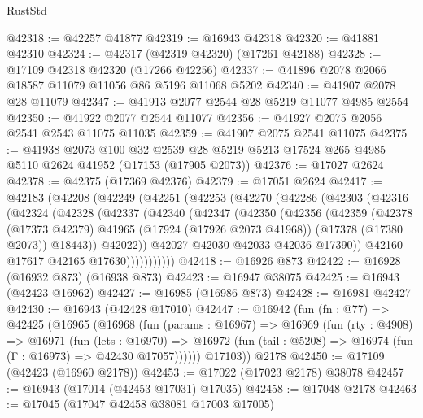 \begin{lexlean}{RustStd}
\begin{coremodule}
@42318 := @42257 @41877
@42319 := @16943 @42318
@42320 := @41881 @42310
@42324 := @42317 (@42319 @42320) (@17261 @42188)
@42328 := @17109 @42318 @42320 (@17266 @42256)
@42337 := @41896 @2078 @2066 @18587 @11079 @11056 @86 @5196 @11068 @5202
@42340 := @41907 @2078 @28 @11079
@42347 := @41913 @2077 @2544 @28 @5219 @11077 @4985 @2554
@42350 := @41922 @2077 @2544 @11077
@42356 := @41927 @2075 @2056 @2541 @2543 @11075 @11035
@42359 := @41907 @2075 @2541 @11075
@42375 := @41938
    @2073
    @100
    @32
    @2539
    @28
    @5219
    @5213
    @17524
    @265
    @4985
    @5110
    @2624
    @41952
    (@17153 (@17905 @2073))
@42376 := @17027 @2624
@42378 := @42375 (@17369 @42376)
@42379 := @17051 @2624
@42417 := @42183
    (@42208
      (@42249
        (@42251
          (@42253
            (@42270
              (@42286
                (@42303
                  (@42316
                    (@42324
                      (@42328
                        (@42337
                          (@42340
                            (@42347
                              (@42350
                                (@42356
                                  (@42359
                                    (@42378
                                      (@17373 @42379)
                                      @41965
                                      (@17924 (@17926 @2073 @41968))
                                      (@17378 (@17380 @2073))
                                      @18443))
                                  @42022))
                              @42027
                              @42030
                              @42033
                              @42036
                              @17390))
                          @42160
                          @17617
                          @42165
                          @17630)))))))))))
@42418 := @16926 @873
@42422 := @16928 (@16932 @873) (@16938 @873)
@42423 := @16947 @38075
@42425 := @16943 (@42423 @16962)
@42427 := @16985 (@16986 @873)
@42428 := @16981 @42427
@42430 := @16943 (@42428 @17010)
@42447 := @16942
    (fun (fn : @77) =>
    @42425
      (@16965
        (@16968
          (fun (params : @16967) =>
          @16969
            (fun (rty : @4908) =>
            @16971
              (fun (lets : @16970) =>
              @16972 (fun (tail : @5208) => @16974 (fun (Γ : @16973) => @42430 @17057))))))
        @17103))
    @2178
@42450 := @17109 (@42423 (@16960 @2178))
@42453 := @17022 (@17023 @2178) @38078
@42457 := @16943 (@17014 (@42453 @17031) @17035)
@42458 := @17048 @2178
@42463 := @17045 (@17047 @42458 @38081 @17003 @17005)

\end{coremodule}
\end{lexlean}
